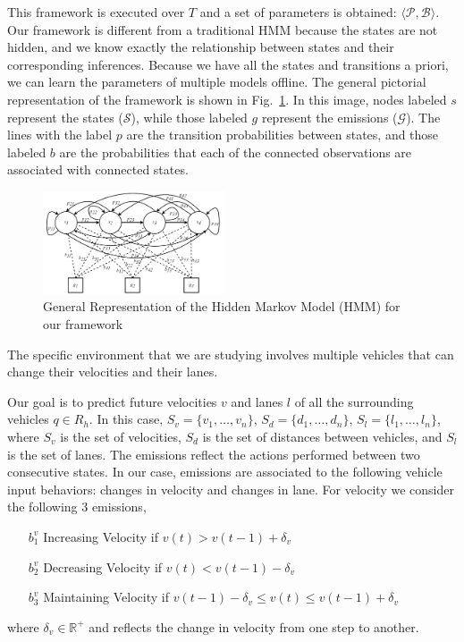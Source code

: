 \documentclass[letterpaper, 10 pt, conference]{ieeeconf}  %
\newcommand\NB[1]{$\spadesuit$\footnote{NB: #1}}
\begin{document}
This framework is executed over $T$ and a set of parameters is obtained: $\langle \mathcal{P}, \mathcal{B} \rangle$. Our framework is different from a traditional HMM because the states are not hidden, and we know exactly the relationship between states and their corresponding inferences. Because we have all the states and transitions a priori, we can learn the parameters of multiple models offline. The general pictorial representation of the framework is shown in Fig.~\ref{fig:hmm}. In this image, nodes labeled $s$ represent the states ($\mathcal{S}$), while those labeled $g$ represent the emissions ($\mathcal{G}$). The lines with the label $p$ are the transition probabilities between states, and those labeled $b$ are the probabilities that each of the connected observations are associated with connected states.
\begin{figure}[h]
    \includegraphics[width=0.48\textwidth]{fig/hmm.png}
    \caption{General Representation of the Hidden Markov Model (HMM) for our framework}
    \label{fig:hmm}
\end{figure}

The specific environment that we are studying involves multiple vehicles that can change their velocities and their lanes.

Our goal is to predict future velocities $v$ and lanes $l$ of all the surrounding vehicles $q\in R_h$. In this case, $S_v = \{v_1,\ldots, v_n\}$, $S_d = \{d_1,\ldots,d_n\}$, $S_l = \{l_1,\ldots,l_n\}$, where $S_v$ is the set of velocities, $S_d$ is the set of distances between vehicles, and $S_l$ is the set of lanes. The emissions reflect the actions performed between two consecutive states. In our case, emissions are associated to the following vehicle input behaviors: changes in velocity and changes in lane.
For velocity we consider the following 3 emissions,

\begin{itemize}
    \item[$b_1^v$] {Increasing Velocity if $v(t) > v(t-1)+\delta_v$} 
    \item[$b_2^v$] {Decreasing Velocity if $v(t) < v(t-1)-\delta_v$}
    \item[$b_3^v$] {Maintaining Velocity if $v(t-1)-\delta_v \leq v(t) \leq v(t-1)+\delta_v$}
\end{itemize}
where $\delta_v\in\mathbb{R}^+$ and reflects the change in velocity from one step to another.
\end{document}
